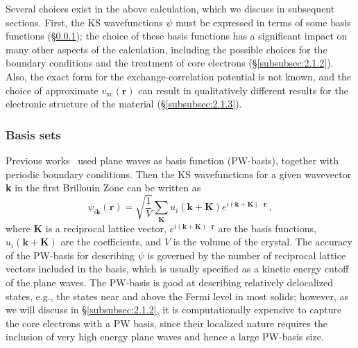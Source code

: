\documentclass[
    prd, twocolumn, superscriptaddress, nofootinbib, amsmath, amssymb,
    aps, floatfix,preprintnumbers
]{revtex4-2}
\begin{document}
        Several choices exist in the above calculation, which we discuss in subsequent sections. First, the KS wavefunctions $\psi$ must be expressed in terms of some basis functions (\S\ref{subsubsec:2.1.1}); the choice of these basis functions has a significant impact on many other aspects of the calculation, including the possible choices for the boundary conditions and the treatment of core electrons (\S\ref{subsubsec:2.1.2}). Also, the exact form for the exchange-correlation potential is not known, and the choice of approximate  $v_{\text{xc}}(\textbf{r})$ can result in qualitatively different results for the electronic structure of the material (\S\ref{subsubsec:2.1.3}). 
    
        \subsubsection{Basis sets}\label{subsubsec:2.1.1}
        Previous works~\cite{Essig:2015cda, Knapen2021Diel, Knapen2022DarkELF, Griffin21, Trickle2022} used plane waves as basis function (PW-basis), together with periodic boundary conditions. Then the KS wavefunctions for a given wavevector \textbf{k} in the first Brillouin Zone can be written as
        \begin{equation}
            \psi_{i\mathbf{k}} (\mathbf{r}) = \sqrt{\frac{1}{V}}\sum_{\mathbf{K}}u_i (\mathbf{k+K})e^{i\mathbf{(k+K)\cdot r}}\,,
        \end{equation}
        where $\textbf{K}$ is a reciprocal lattice vector, $e^{i\mathbf{(k+K)\cdot r}}$ are the basis functions, $u_i (\mathbf{k+K})$ are the coefficients, and $V$ is the volume of the crystal. The accuracy of the PW-basis for describing $\psi$ is governed by the number of reciprocal lattice vectors included in the basis, which is usually specified as a kinetic energy cutoff of the plane waves. The PW-basis is good at describing relatively delocalized states, e.g., the states near and above the Fermi level in most solids; however, as we will discuss in \S\ref{subsubsec:2.1.2}, it is computationally expensive to capture the core electrons with a PW basis, since their localized nature requires the inclusion of very high energy plane waves and hence a large PW-basis size. 
        
\end{document}
